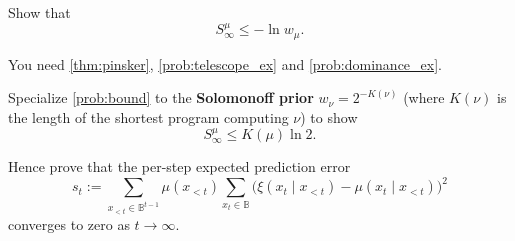 \documentclass[fontsize=11pt, parskip=half]{scrartcl}
\begin{document}
\begin{exercise}
\label{prob:bound_ex}



Show that
\[
S_{\infty}^{\mu} \leq - \ln w_\mu.
\]

\begin{hint}
You need \cref{thm:pinsker}, \cref{prob:telescope_ex} and \cref{prob:dominance_ex}.
\end{hint}
\end{exercise}



\begin{exercise}
\label{prob:bound_explicit_ex}



Specialize \cref{prob:bound} to the \textbf{Solomonoff prior} $w_\nu = 2^{-K(\nu)}$ (where $K(\nu)$ is the length of the shortest program computing $\nu$) to show
\[
S_{\infty}^{\mu} \leq K(\mu) \ln 2.
\]
\end{exercise}


\begin{exercise}
\label{prob:per-step_error}



Hence prove that the per-step expected prediction error
\[
s_t := \sum_{x_{<t} \in \mathbb{B}^{t-1}} \mu(x_{<t}) \sum_{x_t \in \mathbb{B}} \big( \xi(x_t \mid x_{<t}) - \mu(x_t \mid x_{<t}) \big)^2
\]
converges to zero as $t \to \infty$.
\end{exercise}





\end{document}
